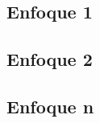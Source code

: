 

\lipsum[0-3]

\subsection{Enfoque 1}

\lipsum[0-1]

\subsection{Enfoque 2}
\lipsum[0-1]
\subsection{Enfoque n}
\lipsum[0-1]

